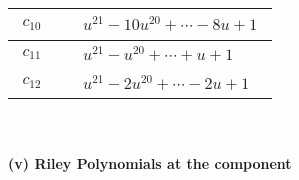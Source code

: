 \documentclass[1p]{elsarticle_modified}
\theoremstyle{definition}
\begin{document}
\begin{tabular}{m{50pt}|m{274pt}}
\hline $$\begin{aligned}c_{10}\end{aligned}$$&$\begin{aligned}
&u^{21}-10 u^{20}+\cdots-8 u+1
\end{aligned}$\\
\hline $$\begin{aligned}c_{11}\end{aligned}$$&$\begin{aligned}
&u^{21}- u^{20}+\cdots+u+1
\end{aligned}$\\
\hline $$\begin{aligned}c_{12}\end{aligned}$$&$\begin{aligned}
&u^{21}-2 u^{20}+\cdots-2 u+1
\end{aligned}$\\
\hline
\end{tabular}\\~\\
\newpage\renewcommand{\arraystretch}{1}
\flushleft \textbf{(v) Riley Polynomials at the component}\newline \\
\end{document}
